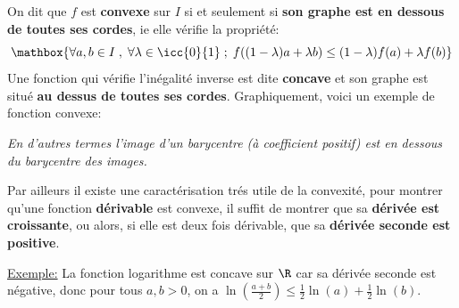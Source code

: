 \subsection*{}

On dit que \(f\) est \textbf{convexe} sur \(I\) si et seulement si \textbf{son graphe est en dessous de toutes ses cordes}, ie elle vérifie la propriété:
\[
   \mathbox{\forall a, b \in I \; , \; \forall \lambda \in \icc{0}{1}\; ; \; f((1-\lambda)a + \lambda b) \leq (1-\lambda)f(a) + \lambda f(b)}   
\]
Une fonction qui vérifie l'inégalité inverse est dite \textbf{concave} et son graphe est situé \textbf{au dessus de toutes ses cordes}.
Graphiquement, voici un exemple de fonction convexe:
\begin{center}
\end{center}
\begin{center}
   \textit{
      En d'autres termes l'image d'un barycentre (à coefficient positif) est en dessous du barycentre des images.
   }
\end{center}
Par ailleurs il existe une caractérisation trés utile de la convexité, pour montrer qu'une fonction \textbf{dérivable} est convexe, il suffit de montrer que sa \textbf{dérivée est croissante}, ou alors, si elle est deux fois dérivable, que sa \textbf{dérivée seconde est positive}.\<

\underline{Exemple:}  La fonction logarithme est concave sur \(\R\) car sa dérivée seconde est négative, donc pour tous \(a, b > 0\), on a \(\ln(\frac{a + b}{2}) \leq \frac{1}{2}\ln(a) + \frac{1}{2}\ln(b)\).

